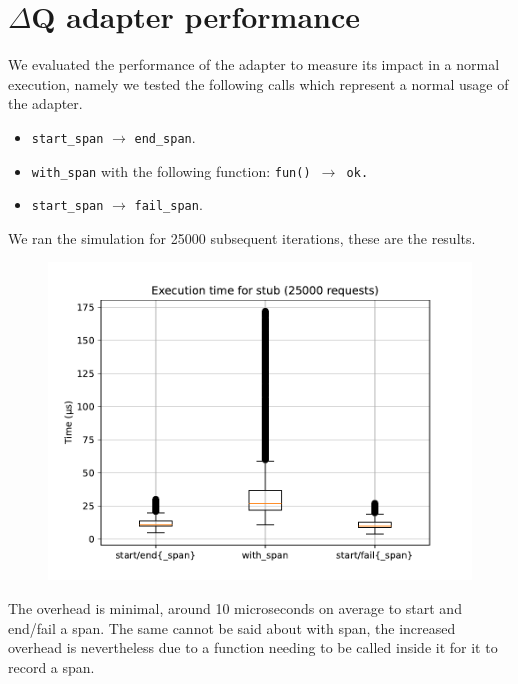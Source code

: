 \section{$\Delta$Q adapter performance}
    We evaluated the performance of the adapter to measure its impact in a normal execution, namely we tested the following calls which represent a normal usage of the adapter.
    \begin{itemize}
        \item \texttt{start\_span} $\rightarrow$ \texttt{end\_span}.
        \item \texttt{with\_span} with the following function: \texttt{fun() $\rightarrow$ ok.}
        \item \texttt{start\_span} $\rightarrow$ \texttt{fail\_span}.
    \end{itemize}

    We ran the simulation for 25000 subsequent iterations, these are the results.
    \begin{figure}[H]
        \begin{center}
            \includegraphics[width=0.8\linewidth]{img/stub.pdf}
        \end{center}
    \end{figure}

    The overhead is minimal, around 10 microseconds on average to start and end/fail a span. The same cannot be said about with span, the increased overhead is nevertheless due to a function needing to be called inside it for it to record a span. 


